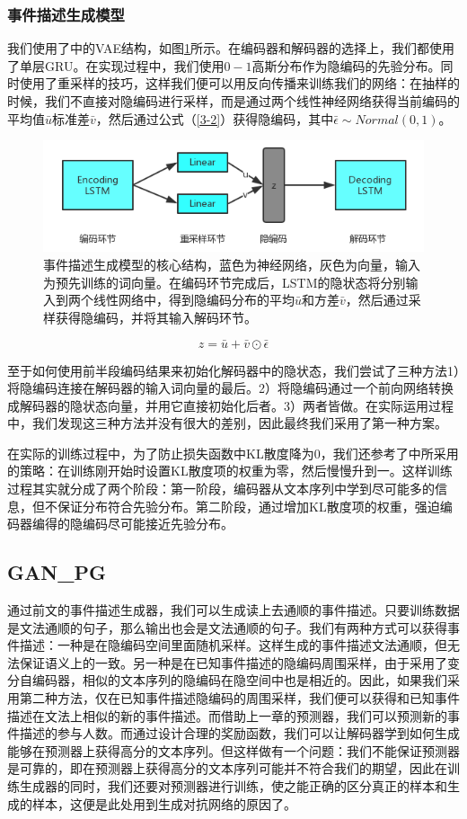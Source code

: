 \documentclass[]{template}
\begin{document}
\subsubsection{事件描述生成模型}
我们使用了\cite{bowman_generating_2015}中的VAE结构，如图\ref{f3-2}所示。在编码器和解码器的选择上，我们都使用了单层GRU。在实现过程中，我们使用$0-1$高斯分布作为隐编码的先验分布。同时使用了重采样\cite{kingma_auto-encoding_2013}的技巧，这样我们便可以用反向传播来训练我们的网络：在抽样的时候，我们不直接对隐编码进行采样，而是通过两个线性神经网络获得当前编码的平均值$\bar{u}$标准差$\bar{v}$，然后通过公式（\ref{3-2}）获得隐编码，其中$\bar\epsilon \sim Normal(0,1)$。
\begin{figure}[htb]\label{f3-2}
    \centering
    \includegraphics[width=11.3cm]{vae.png}
    \caption{事件描述生成模型的核心结构，蓝色为神经网络，灰色为向量，输入为预先训练的词向量。在编码环节完成后，LSTM的隐状态将分别输入到两个线性网络中，得到隐编码分布的平均$\bar{u}$和方差$\bar{v}$，然后通过采样获得隐编码，并将其输入解码环节。}
\end{figure}
\begin{equation}\label{3-2}
    z=\bar{u}+\bar{v}\odot \bar\epsilon
\end{equation}

至于如何使用前半段编码结果来初始化解码器中的隐状态，我们尝试了三种方法1）将隐编码连接在解码器的输入词向量的最后。2）将隐编码通过一个前向网络转换成解码器的隐状态向量，并用它直接初始化后者。3）两者皆做。在实际运用过程中，我们发现这三种方法并没有很大的差别，因此最终我们采用了第一种方案。

在实际的训练过程中，为了防止损失函数中KL散度降为0，我们还参考了\cite{bowman_generating_2015}中所采用的策略：在训练刚开始时设置KL散度项的权重为零，然后慢慢升到一。这样训练过程其实就分成了两个阶段：第一阶段，编码器从文本序列中学到尽可能多的信息，但不保证分布符合先验分布。第二阶段，通过增加KL散度项的权重，强迫编码器编得的隐编码尽可能接近先验分布。

\subsection{GAN\_PG}
通过前文的事件描述生成器，我们可以生成读上去通顺的事件描述。只要训练数据是文法通顺的句子，那么输出也会是文法通顺的句子。我们有两种方式可以获得事件描述：一种是在隐编码空间里面随机采样。这样生成的事件描述文法通顺，但无法保证语义上的一致。另一种是在已知事件描述的隐编码周围采样，由于采用了变分自编码器，相似的文本序列的隐编码在隐空间中也是相近的。因此，如果我们采用第二种方法，仅在已知事件描述隐编码的周围采样，我们便可以获得和已知事件描述在文法上相似的新的事件描述。而借助上一章的预测器，我们可以预测新的事件描述的参与人数。而通过设计合理的奖励函数，我们可以让解码器学到如何生成能够在预测器上获得高分的文本序列。但这样做有一个问题：我们不能保证预测器是可靠的，即在预测器上获得高分的文本序列可能并不符合我们的期望，因此在训练生成器的同时，我们还要对预测器进行训练，使之能正确的区分真正的样本和生成的样本，这便是此处用到生成对抗网络的原因了。
\end{document}

